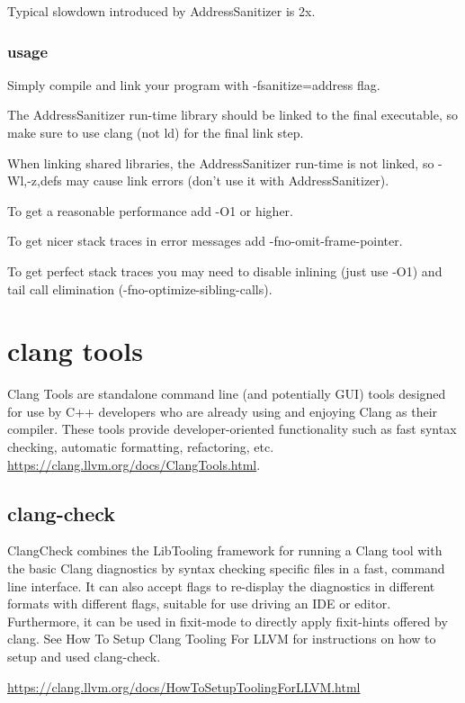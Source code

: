 Typical slowdown introduced by AddressSanitizer is 2x.

\subsubsection{usage}%
\label{ssub:usage}
Simply compile and link your program with -fsanitize=address flag. 

The AddressSanitizer run-time library should be linked to the final executable, so make sure to use clang (not ld) for the final link step.

When linking shared libraries, the AddressSanitizer run-time is not linked, so -Wl,-z,defs may cause link errors (don’t use it with AddressSanitizer).

To get a reasonable performance add -O1 or higher.

To get nicer stack traces in error messages add -fno-omit-frame-pointer.

To get perfect stack traces you may need to disable inlining (just use -O1) and tail call elimination (-fno-optimize-sibling-calls).



\section{clang tools}
Clang Tools are standalone command line (and potentially GUI) tools designed for use by C++ developers who are already using and enjoying Clang as their compiler. These tools provide developer-oriented functionality such as fast syntax checking, automatic formatting, refactoring, etc. \href{Clang 16.0.0git documentation}{https://clang.llvm.org/docs/ClangTools.html}.

\subsection{clang-check}%
\label{sub:clang_check}
ClangCheck combines the LibTooling framework for running a Clang tool with the basic Clang diagnostics by syntax checking specific files in a fast, command line interface. It can also accept flags to re-display the diagnostics in different formats with different flags, suitable for use driving an IDE or editor. Furthermore, it can be used in fixit-mode to directly apply fixit-hints offered by clang. See How To Setup Clang Tooling For LLVM for instructions on how to setup and used clang-check.


\href{How To Setup Clang Tooling For LLVM}{https://clang.llvm.org/docs/HowToSetupToolingForLLVM.html} 

